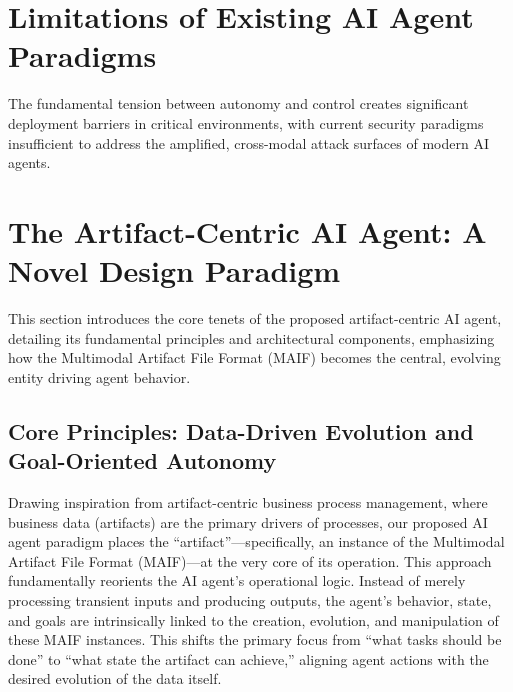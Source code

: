 \documentclass[conference]{IEEEtran}
\begin{document}
\section{Limitations of Existing AI Agent Paradigms}
\label{sec:limitations}



The fundamental tension between autonomy and control creates significant deployment barriers in critical environments, with current security paradigms insufficient to address the amplified, cross-modal attack surfaces of modern AI agents.

\section{The Artifact-Centric AI Agent: A Novel Design Paradigm}
\label{sec:artifact-centric}

This section introduces the core tenets of the proposed artifact-centric AI agent, detailing its fundamental principles and architectural components, emphasizing how the Multimodal Artifact File Format (MAIF) becomes the central, evolving entity driving agent behavior.

\subsection{Core Principles: Data-Driven Evolution and Goal-Oriented Autonomy}

Drawing inspiration from artifact-centric business process management, where business data (artifacts) are the primary drivers of processes, our proposed AI agent paradigm places the ``artifact''---specifically, an instance of the Multimodal Artifact File Format (MAIF)---at the very core of its operation\cite{ref10}. This approach fundamentally reorients the AI agent's operational logic. Instead of merely processing transient inputs and producing outputs, the agent's behavior, state, and goals are intrinsically linked to the creation, evolution, and manipulation of these MAIF instances. This shifts the primary focus from ``what tasks should be done'' to ``what state the artifact can achieve,'' aligning agent actions with the desired evolution of the data itself\cite{ref12}.
\end{document}
